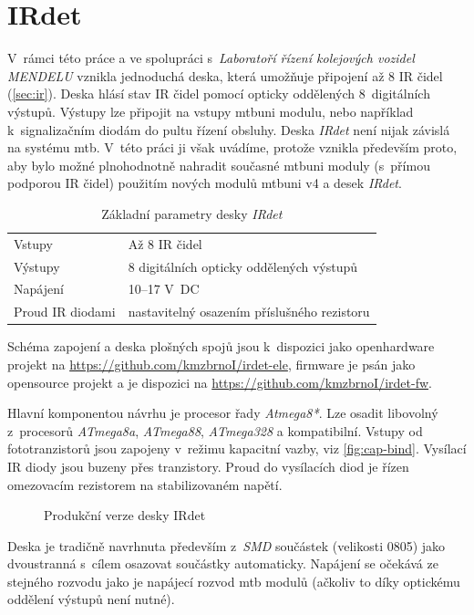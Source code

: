 \newpage
\section{IRdet} \label{sec:irdet}

V~rámci této práce a ve spolupráci s~\textit{Laboratoří řízení kolejových
vozidel MENDELU} vznikla jednoduchá deska, která umožňuje připojení až 8 IR
čidel (\ref{sec:ir}). Deska hlásí stav IR čidel pomocí opticky oddělených
8~digitálních výstupů. Výstupy lze připojit na vstupy \gls{mtbuni}
modulu, nebo například k~signalizačním diodám do pultu řízení obsluhy.
Deska \textit{IRdet} není nijak závislá na systému \gls{mtb}. V~této práci ji
však uvádíme, protože vznikla především proto, aby bylo možné plnohodnotně
nahradit současné \gls{mtbuni} moduly (s~přímou podporou IR čidel) použitím
nových modulů \gls{mtbuni} v4 a desek \textit{IRdet}.

\begin{table}[h]
	\begin{tabularx}{\textwidth}{lX}
		\toprule
		Vstupy & Až 8 IR čidel \\
		Výstupy & 8 digitálních opticky oddělených výstupů \\
		Napájení & 10–17 V~DC \\
		Proud IR diodami & nastavitelný osazením příslušného rezistoru \\
		\bottomrule
	\end{tabularx}
	\caption{Základní parametry desky \textit{IRdet}}
	\label{tab:mtbuni-params}
\end{table}

Schéma zapojení a deska plošných spojů jsou k~dispozici jako openhardware
projekt na \url{https://github.com/kmzbrnoI/irdet-ele}, firmware je psán jako
opensource projekt a je dispozici na
\url{https://github.com/kmzbrnoI/irdet-fw}.

Hlavní komponentou návrhu je procesor řady \textit{Atmega8*}. Lze osadit
libovolný z~procesorů \textit{ATmega8a}, \textit{ATmega88}, \textit{ATmega328}
a kompatibilní. Vstupy od fototranzistorů jsou zapojeny v~režimu kapacitní
vazby, viz \ref{fig:cap-bind}. Vysílací IR diody jsou buzeny přes tranzistory.
Proud do vysílacích diod je řízen omezovacím rezistorem na stabilizovaném
napětí.

\begin{figure}[ht]
\caption{Produkční verze desky IRdet}
\label{fig:irdet}
\end{figure}

Deska je tradičně navrhnuta především z~\textit{SMD} součástek (velikosti 0805)
jako dvoustranná s~cílem osazovat součástky automaticky. Napájení se očekává
ze stejného rozvodu jako je napájecí rozvod \gls{mtb} modulů (ačkoliv to díky
optickému oddělení výstupů není nutné).
